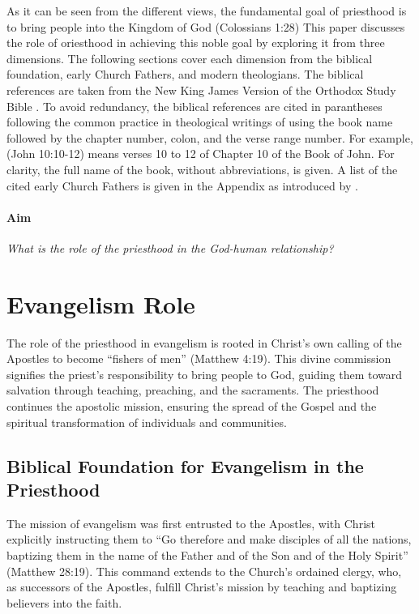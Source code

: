\documentclass[12pt, doc]{apa7}   	%
\begin{document}
As it can be seen from the different views, the fundamental goal of priesthood is to bring people into the Kingdom of God (Colossians 1:28) This paper discusses the role of oriesthood in achieving this noble goal by exploring it from three dimensions.  The following sections cover each dimension from the biblical foundation, early Church Fathers, and modern theologians.  The biblical references are taken from the New King James Version of the Orthodox Study Bible \citep{nelson_nkjv}.  To avoid redundancy, the biblical references are cited in parantheses following the common practice in theological writings of using the book name followed by the chapter number, colon, and the verse range number.  For example, (John 10:10-12) means verses 10 to 12 of Chapter 10 of the Book of John.  For clarity, the full name of the book, without abbreviations, is given.  A list of the cited early Church Fathers is given in the Appendix as introduced by \citet{early_church_akin}.

\vskip 0.5cm
\paragraph{Aim}  \emph{What is the role of the priesthood in the God-human relationship?}



\section{Evangelism Role}\label{evangelism}
The role of the priesthood in evangelism is rooted in Christ’s own calling of the Apostles to become “fishers of men” (Matthew 4:19). This divine commission signifies the priest’s responsibility to bring people to God, guiding them toward salvation through teaching, preaching, and the sacraments. The priesthood continues the apostolic mission, ensuring the spread of the Gospel and the spiritual transformation of individuals and communities.

\subsection{Biblical Foundation for Evangelism in the Priesthood}

The mission of evangelism was first entrusted to the Apostles, with Christ explicitly instructing them to “Go therefore and make disciples of all the nations, baptizing them in the name of the Father and of the Son and of the Holy Spirit” (Matthew 28:19). This command extends to the Church’s ordained clergy, who, as successors of the Apostles, fulfill Christ’s mission by teaching and baptizing believers into the faith.
\end{document}
